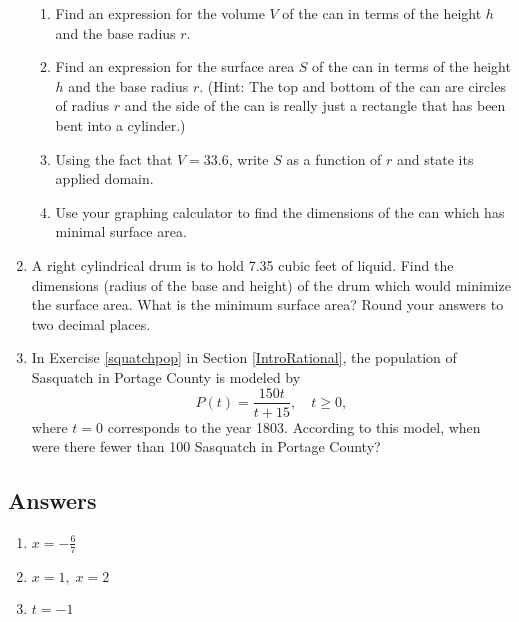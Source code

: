 \documentclass{ximera}
\begin{document}
\begin{enumerate}
\begin{enumerate}

\item Find an expression for the volume $V$ of the can in terms of the height $h$ and the base radius $r$.
\item Find an expression for the surface area $S$ of the can in terms of the height $h$ and the base radius $r$.  (Hint: The top and bottom of the can are circles of radius $r$ and the side of the can is really just a rectangle that has been bent into a cylinder.)
\item Using the fact that $V = 33.6$, write $S$ as a function of $r$ and state its applied domain.
\item Use your graphing calculator to find the dimensions of the can which has minimal surface area.

\end{enumerate}

\item  A right cylindrical drum is to hold 7.35 cubic feet of liquid.  Find the dimensions (radius of the base and height) of the drum which would minimize the surface area.  What is the minimum surface area?  Round your answers to two decimal places.


\item In Exercise \ref{squatchpop} in Section \ref{IntroRational}, the population of Sasquatch in Portage County is modeled by  \[P(t) = \frac{150t}{t + 15}, \quad t \geq 0,\] where $t = 0$ corresponds to the year 1803.  According to this model, when were there fewer than 100 Sasquatch in Portage County?

\setcounter{HW}{\value{enumi}}
\end{enumerate}



\newpage

\subsection{Answers}

\begin{multicols}{3} 
\begin{enumerate}

\item $x = -\frac{6}{7}$
\item $x = 1, \; x = 2$
\item $t = -1$

\setcounter{HW}{\value{enumi}}
\end{enumerate}
\end{multicols}
\end{document}
